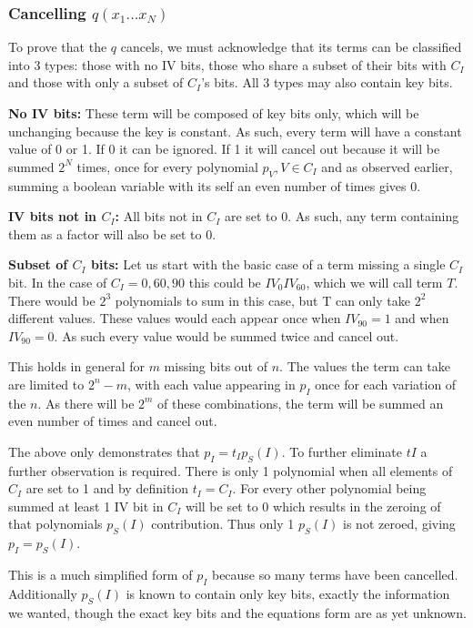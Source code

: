 \documentclass{report}
\let\Oldsubsubsection\subsubsection
\renewcommand{\subsubsection}{\FloatBarrier\Oldsubsubsection}
\begin{document}
\subsubsection{Cancelling $q(x_1...x_N)$}
To prove that the $q$ cancels, we must acknowledge that its terms can be classified into 3 types: those with no IV bits, those who share a subset of their bits with $C_I$ and those with only a subset of $C_I$'s bits. All 3 types may also contain key bits.

\textbf{No IV bits:}
These term will be composed of key bits only, which will be unchanging because the key is constant. As such, every term will have a constant value of 0 or 1. If 0 it can be ignored. If 1 it will cancel out because it will be summed $2^N$ times, once for every polynomial $p_V, V \in C_I$ and as observed earlier, summing a boolean variable with its self an even number of times gives 0.

\textbf{IV bits not in $C_I$:}
All bits not in $C_I$ are set to 0. As such, any term containing them as a factor will also be set to 0.

\textbf{Subset of $C_I$ bits:}
Let us start with the basic case of a term missing a single $C_I$ bit. In the case of $C_I={0, 60, 90}$ this could be $IV_0IV_{60}$, which we will call term $T$. There would be $2^3$ polynomials to sum in this case, but T can only take $2^2$ different values. These values would each appear once when $IV_{90} = 1$ and when $IV_{90} = 0$. As such every value would be summed twice and cancel out.

This holds in general for $m$ missing bits out of $n$. The values the term can take are limited to $2^n-m$, with each value appearing in $p_I$ once for each variation of the $n$. As there will be $2^m$ of these combinations, the term will be summed an even number of times and cancel out. 

The above only demonstrates that $p_I=t_Ip_S(I)$. To further eliminate $tI$ a further observation is required. There is only 1 polynomial when all elements of $C_I$ are set to 1 and by definition $t_I=C_I$. For every other polynomial being summed at least 1 IV bit in $C_I$ will be set to 0 which results in the zeroing of that polynomials $p_S(I)$ contribution. Thus only 1 $p_S(I)$ is not zeroed, giving $p_I=p_S(I)$.

This is a much simplified form of $p_I$ because so many terms have been cancelled. Additionally $p_S(I)$ is known to contain only key bits, exactly the information we wanted, though the exact key bits and the equations form are as yet unknown.
\end{document}
